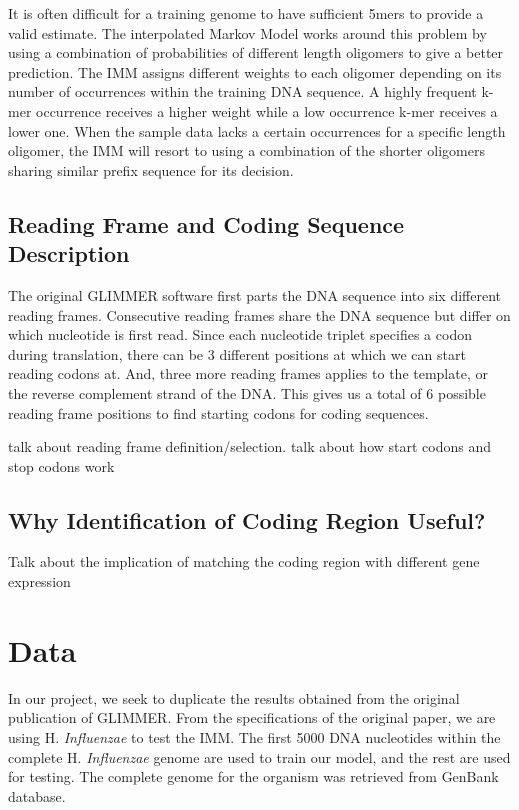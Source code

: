 \documentclass[11pt,letterpaper]{article}
\begin{document}
It is often difficult for a training genome to have sufficient 5mers to provide a valid estimate. The interpolated Markov Model works around this problem by using a combination of probabilities of different length oligomers to give a better prediction. The IMM assigns different weights to each oligomer depending on its number of occurrences within the training DNA sequence. A highly frequent k-mer occurrence receives a higher weight while a low occurrence k-mer receives a lower one. When the sample data lacks a certain occurrences for a specific length oligomer, the IMM will resort to using a combination of the shorter oligomers sharing similar prefix sequence for its decision. 


\subsection{Reading Frame and Coding Sequence Description}

The original GLIMMER software first parts the DNA sequence into six different reading frames. Consecutive reading frames share the DNA sequence but differ on which nucleotide is first read. Since each nucleotide triplet specifies a codon during translation, there can be 3 different positions at which we can start reading codons at. And, three more reading frames applies to the template, or the reverse complement strand of the DNA. This gives us a total of 6 possible reading frame positions to find starting codons for coding sequences. 

talk about reading frame definition/selection. talk about how start codons and stop codons work

\subsection{Why Identification of Coding Region Useful?}

Talk about the implication of matching the coding region with different gene expression

\section{Data}

In our project, we seek to duplicate the results obtained from the original publication of GLIMMER. From the specifications of the original paper, we are using H. \emph{Influenzae} to test the IMM. The first 5000 DNA nucleotides within the complete H. \emph{Influenzae} genome are used to train our model, and the rest are used for testing. The complete genome for the organism was retrieved from GenBank database.
\end{document}

